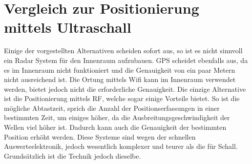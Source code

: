 \section{Vergleich zur Positionierung mittels Ultraschall}
Einige der vorgestellten Alternativen scheiden sofort aus, so ist es nicht sinnvoll ein Radar System für den Innenraum aufzubauen. GPS scheidet ebenfalls aus, da es im Innenraum nicht funktioniert und die Genauigkeit von ein paar Metern nicht ausreichend ist. Die Ortung mittels Wifi kann im Innenraum verwendet werden, bietet jedoch nicht die erforderliche Genauigkeit. Die einzige Alternative ist die Positionierung mittels RF, welche sogar einige Vorteile bietet. So ist die mögliche Abtastzeit, sprich die Anzahl der Positionserfassungen in einer bestimmten Zeit, um einiges höher, da die Ausbreitungsgeschwindigkeit der Wellen viel höher ist. Dadurch kann auch die Genauigkeit der bestimmten Position erhöht werden.  Diese Systeme sind wegen der schnellen Auswerteelektronik, jedoch wesentlich komplexer und teurer als die für Schall. Grundsätzlich ist die Technik jedoch dieselbe.